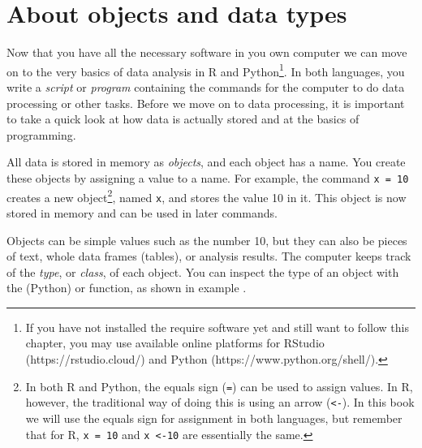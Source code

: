 \newcommand{\fnarrow}{\footnote{In both R and Python, the equals
  sign (\texttt{=}) can be used to assign values. In R, however, the
  traditional way of doing this is using an arrow (\texttt{\textless-}). In
  this book we will use the equals sign for assignment in both
  languages, but remember that for R, \texttt{x = 10} and
  \texttt{x \textless-10} are essentially the same.}}


\section{About objects and data types}
\label{sec:datatypes}

Now that you have all the necessary software in you own computer we
can move on to the very basics of data analysis in R and
Python\footnote{If you have not installed the require software yet and
  still want to follow this chapter, you may use available online
  platforms for RStudio (https://rstudio.cloud/) and Python
  (https://www.python.org/shell/).}.  In both languages, you write a
\emph{script} or \emph{program} containing the commands for the
computer to do data processing or other tasks.  Before we move on to
data processing, it is important to take a quick look at how data is
actually stored and at the basics of programming.

All data is stored in memory as \emph{objects}, and each object
has a name.  You create these objects by
assigning a value to a name. For example, the command \texttt{x = 10}
creates a new object\fnarrow, named \texttt{x}, and stores the value 10
in it.  This object is now stored in memory and can be used in later
commands.


Objects can be simple values such as the number 10, but they can also
be pieces of text, whole data frames (tables), or analysis results.  The
computer keeps track of the \emph{type}, or \emph{class}, of each
object.  You can inspect the type of an object with the 
(Python) or  function, as shown in example . 

